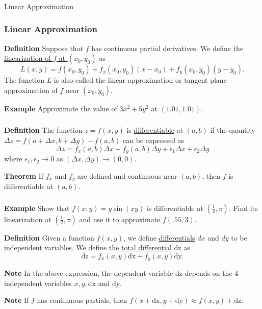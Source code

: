 \begin{frame}[fragile]\frametitle{}
\begin{center}
{\Large Linear Approximation}
\end{center}
\end{frame}





\begin{frame}[fragile]  \frametitle{Linear Approximation}
  \textbf{Definition}
    Suppose that $f$ has continuous partial derivatives.  We define the \underline{linearization of $f$ at $(x_0,y_0)$} as
    $$
      L(x,y) = f(x_0,y_0) +  f_x(x_0,y_0)(x-x_0) + f_y(x_0,y_0)(y-y_0).
    $$
    The function $L$ is also called the linear approximation or tangent plane approximation of $f$ near $(x_0,y_0)$.
    
  
  \textbf{Example}
    Approximate the value of $3x^2+5y^2$ at $(1.01,1.01)$.
  
  
\end{frame}


\begin{frame}[fragile]\frametitle{}
  \textbf{Definition}
    The function $z=f(x,y)$ is  \underline{differentiable} at $(a,b)$ if the quantity $\Delta z = f(a+\Delta x,b+\Delta y) -f(a,b)$ can be expressed as
    $$
      \Delta z = f_x(a,b)\Delta x + f_y(a,b)\Delta y +\epsilon_1\Delta x + \epsilon_2\Delta y
    $$
    where $\epsilon_1,\epsilon_2 \rightarrow 0$ as $(\Delta x,\Delta y)\rightarrow (0,0)$.
   
  
  \textbf{Theorem}
    If $f_x$ and $f_y$ are defined and continuous near $(a,b)$, then $f$ is differentiable at $(a,b)$.
  
\end{frame}

\begin{frame}[fragile]\frametitle{}
  \textbf{Example}
    Show that $f(x,y)=y\sin(xy)$ is differentiable at $(\frac{1}{2},\pi)$.  Find its linearization at $(\frac{1}{2},\pi)$ and use it to 
    approximate $f(.55,3)$.
    
  
  \textbf{Definition}
    Given a function $f(x,y)$, we define \underline{differentials} $dx$ and $dy$ to be independent variables.  We define the \underline{total differential} $\text{dz}$ as
    $$ \text{dz} = f_x(x,y)\text{dx} + f_y(x,y)\text{dy}.$$
   
  
  \textbf{Note}
    In the above expression, the dependent variable $\text{dz}$ depends on the 4 independent variables $x,y,\text{dx}$ and $\text{dy}$.
   
  
   \textbf{Note}
    If $f$ has continuous partials, then $f(x+\text{dx},y+\text{dy})\approx f(x,y) +\text{dz}$.
  

\end{frame}


